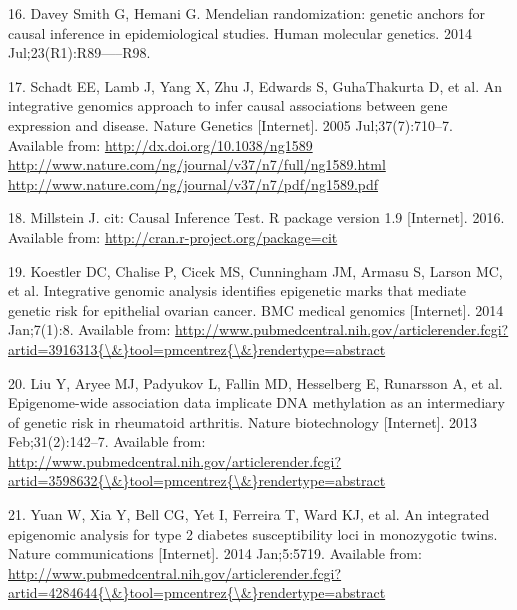 \documentclass[]{article}
\begin{document}
\hypertarget{ref-DaveySmithHemani2014}{}
16. Davey Smith G, Hemani G. Mendelian randomization: genetic anchors
for causal inference in epidemiological studies. Human molecular
genetics. 2014 Jul;23(R1):R89-----R98.

\hypertarget{ref-Schadt2005}{}
17. Schadt EE, Lamb J, Yang X, Zhu J, Edwards S, GuhaThakurta D, et al.
An integrative genomics approach to infer causal associations between
gene expression and disease. Nature Genetics {[}Internet{]}. 2005
Jul;37(7):710--7. Available from:
\href{http://dx.doi.org/10.1038/ng1589\%20http://www.nature.com/ng/journal/v37/n7/full/ng1589.html\%20http://www.nature.com/ng/journal/v37/n7/pdf/ng1589.pdf}{http://dx.doi.org/10.1038/ng1589 http://www.nature.com/ng/journal/v37/n7/full/ng1589.html http://www.nature.com/ng/journal/v37/n7/pdf/ng1589.pdf}

\hypertarget{ref-Millstein2016}{}
18. Millstein J. cit: Causal Inference Test. R package version 1.9
{[}Internet{]}. 2016. Available from:
\url{http://cran.r-project.org/package=cit}

\hypertarget{ref-Koestler2014}{}
19. Koestler DC, Chalise P, Cicek MS, Cunningham JM, Armasu S, Larson
MC, et al. Integrative genomic analysis identifies epigenetic marks that
mediate genetic risk for epithelial ovarian cancer. BMC medical genomics
{[}Internet{]}. 2014 Jan;7(1):8. Available from:
\href{http://www.pubmedcentral.nih.gov/articlerender.fcgi?artid=3916313\%7B/\&\%7Dtool=pmcentrez\%7B/\&\%7Drendertype=abstract}{http://www.pubmedcentral.nih.gov/articlerender.fcgi?artid=3916313\{\textbackslash{}\&\}tool=pmcentrez\{\textbackslash{}\&\}rendertype=abstract}

\hypertarget{ref-Liu2013}{}
20. Liu Y, Aryee MJ, Padyukov L, Fallin MD, Hesselberg E, Runarsson A,
et al. Epigenome-wide association data implicate DNA methylation as an
intermediary of genetic risk in rheumatoid arthritis. Nature
biotechnology {[}Internet{]}. 2013 Feb;31(2):142--7. Available from:
\href{http://www.pubmedcentral.nih.gov/articlerender.fcgi?artid=3598632\%7B/\&\%7Dtool=pmcentrez\%7B/\&\%7Drendertype=abstract}{http://www.pubmedcentral.nih.gov/articlerender.fcgi?artid=3598632\{\textbackslash{}\&\}tool=pmcentrez\{\textbackslash{}\&\}rendertype=abstract}

\hypertarget{ref-Yuan2014}{}
21. Yuan W, Xia Y, Bell CG, Yet I, Ferreira T, Ward KJ, et al. An
integrated epigenomic analysis for type 2 diabetes susceptibility loci
in monozygotic twins. Nature communications {[}Internet{]}. 2014
Jan;5:5719. Available from:
\href{http://www.pubmedcentral.nih.gov/articlerender.fcgi?artid=4284644\%7B/\&\%7Dtool=pmcentrez\%7B/\&\%7Drendertype=abstract}{http://www.pubmedcentral.nih.gov/articlerender.fcgi?artid=4284644\{\textbackslash{}\&\}tool=pmcentrez\{\textbackslash{}\&\}rendertype=abstract}
\end{document}
